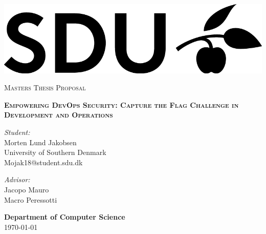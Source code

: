 \documentclass[a4, 12pt]{article}
\begin{document}
\begin{titlepage}

\begin{center}
   \includegraphics[scale=0.7]{img/SDU_logo.png} 
\end{center}
   
\thispagestyle{fancy}

\center

\textsc{\large Masters Thesis Proposal}

\vspace{0.5in}

\noindent\makebox[\linewidth]{\rule{\linewidth}{1.2pt}}
\textsc{\textbf{Empowering DevOps Security: Capture the Flag Challenge in Development and Operations}}
\noindent\makebox[\linewidth]{\rule{\linewidth}{1.2pt}}

\vspace{0.5in}

\begin{minipage}{0.48\textwidth}
    \begin{flushleft}
        \textit{Student:} \\
        Morten Lund Jakobsen \\
        University of Southern Denmark \\
        Mojak18@student.sdu.dk
    \end{flushleft}
\end{minipage}
\begin{minipage}{0.48\textwidth}
    \begin{flushright}
    \textit{Advisor:} \\
    Jacopo Mauro \\
    Macro Peressotti \\
    \end{flushright}
\end{minipage}

\vspace{2in}

\textbf{\large Department of Computer Science} \\

\today
\thispagestyle{empty}

\end{titlepage}
\end{document}
